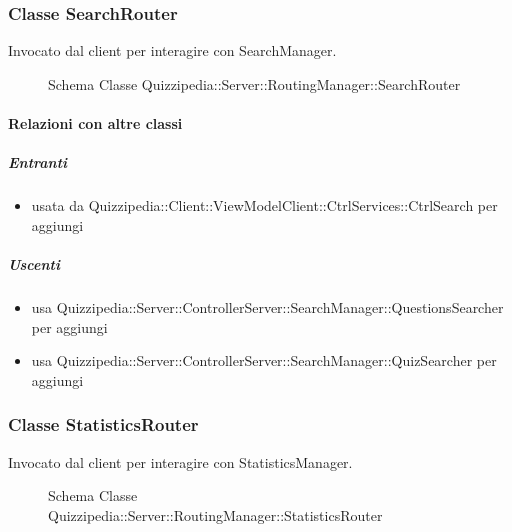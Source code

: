 \subsubsection{Classe SearchRouter}
Invocato dal client per interagire con SearchManager.
\begin{figure}[H]
\centering
\noindent{}
\caption[Schema Classe SearchRouter]{Schema Classe Quizzipedia::Server::RoutingManager::SearchRouter}
\end{figure}
\paragraph{Relazioni con altre classi}
\subparagraph{Entranti}
\begin{itemize}
\item usata da Quizzipedia::Client::ViewModelClient::CtrlServices::CtrlSearch per aggiungi
\end{itemize}
\subparagraph{Uscenti}
\begin{itemize}
\item usa Quizzipedia::Server::ControllerServer::SearchManager::QuestionsSearcher per aggiungi
\item usa Quizzipedia::Server::ControllerServer::SearchManager::QuizSearcher per aggiungi
\end{itemize}
\subsubsection{Classe StatisticsRouter}
Invocato dal client per interagire con StatisticsManager.
\begin{figure}[H]
\centering
\noindent{}
\caption[Schema Classe StatisticsRouter]{Schema Classe Quizzipedia::Server::RoutingManager::StatisticsRouter}
\end{figure}

